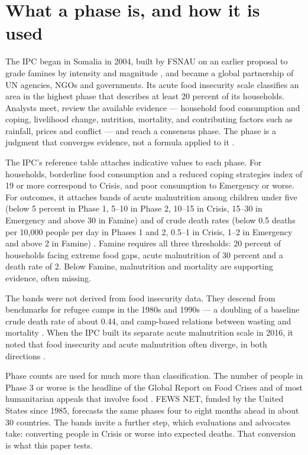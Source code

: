 \documentclass[11pt]{article}
\begin{document}
\section{What a phase is, and how it is used}\label{sec:ipc}

The IPC began in Somalia in 2004, built by FSNAU on an earlier proposal to grade famines by intensity and magnitude \citep{HoweDevereux2004}, and became a global partnership of UN agencies, NGOs and governments. Its acute food insecurity scale classifies an area in the highest phase that describes at least 20 percent of its households. Analysts meet, review the available evidence --- household food consumption and coping, livelihood change, nutrition, mortality, and contributing factors such as rainfall, prices and conflict --- and reach a consensus phase. The phase is a judgment that converges evidence, not a formula applied to it \citep{IPC2021manual}.

The IPC's reference table attaches indicative values to each phase. For households, borderline food consumption and a reduced coping strategies index of 19 or more correspond to Crisis, and poor consumption to Emergency or worse. For outcomes, it attaches bands of acute malnutrition among children under five (below 5 percent in Phase 1, 5--10 in Phase 2, 10--15 in Crisis, 15--30 in Emergency and above 30 in Famine) and of crude death rates (below 0.5 deaths per 10,000 people per day in Phases 1 and 2, 0.5--1 in Crisis, 1--2 in Emergency and above 2 in Famine) \citep{ipcreftable}. Famine requires all three thresholds: 20 percent of households facing extreme food gaps, acute malnutrition of 30 percent and a death rate of 2. Below Famine, malnutrition and mortality are supporting evidence, often missing.

The bands were not derived from food insecurity data. They descend from benchmarks for refugee camps in the 1980s and 1990s --- a doubling of a baseline crude death rate of about 0.44, and camp-based relations between wasting and mortality \citep{youngjaspars2009}. When the IPC built its separate acute malnutrition scale in 2016, it noted that food insecurity and acute malnutrition often diverge, in both directions \citep{ipc2016amn,ipc2024linkages}.

Phase counts are used for much more than classification. The number of people in Phase 3 or worse is the headline of the Global Report on Food Crises and of most humanitarian appeals that involve food \citep{GRFC2026}. FEWS NET, funded by the United States since 1985, forecasts the same phases four to eight months ahead in about 30 countries. The bands invite a further step, which evaluations and advocates take: converting people in Crisis or worse into expected deaths. That conversion is what this paper tests.
\end{document}
